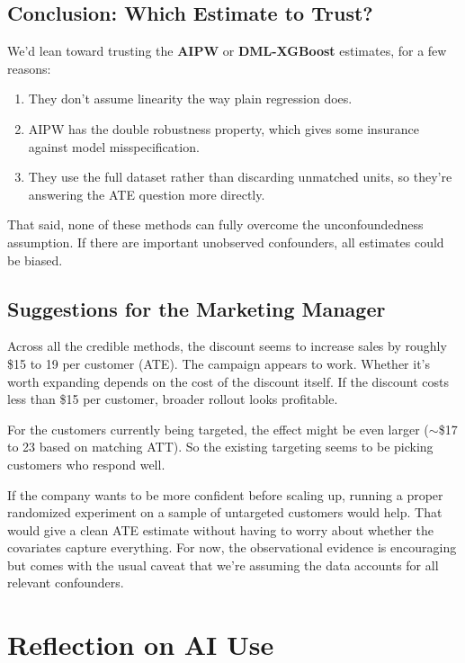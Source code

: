 \documentclass[12pt,a4paper]{article}
\begin{document}
\subsection{Conclusion: Which Estimate to Trust?}

We'd lean toward trusting the \textbf{AIPW} or \textbf{DML-XGBoost} estimates, for a few reasons:

\begin{enumerate}
\item They don't assume linearity the way plain regression does.
\item AIPW has the double robustness property, which gives some insurance against model misspecification.
\item They use the full dataset rather than discarding unmatched units, so they're answering the ATE question more directly.
\end{enumerate}

That said, none of these methods can fully overcome the unconfoundedness assumption. If there are important unobserved confounders, all estimates could be biased.

\subsection{Suggestions for the Marketing Manager}

Across all the credible methods, the discount seems to increase sales by roughly \$15 to 19 per customer (ATE). The campaign appears to work. Whether it's worth expanding depends on the cost of the discount itself. If the discount costs less than \$15 per customer, broader rollout looks profitable.

For the customers currently being targeted, the effect might be even larger ($\sim$\$17 to 23 based on matching ATT). So the existing targeting seems to be picking customers who respond well.

If the company wants to be more confident before scaling up, running a proper randomized experiment on a sample of untargeted customers would help. That would give a clean ATE estimate without having to worry about whether the covariates capture everything. For now, the observational evidence is encouraging but comes with the usual caveat that we're assuming the data accounts for all relevant confounders.

\section{Reflection on AI Use}
\end{document}
